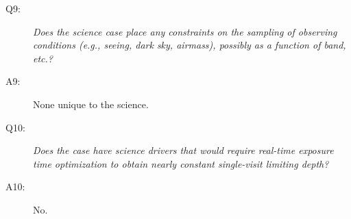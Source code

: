 \begin{description}
\item[Q9:] {\it Does the science case place any constraints on the
sampling of observing conditions (e.g., seeing, dark sky, airmass),
possibly as a function of band, etc.?}

\item[A9:] None unique to the science.

\item[Q10:] {\it Does the case have science drivers that would require
real-time exposure time optimization to obtain nearly constant
single-visit limiting depth?}

\item[A10:] No.

\end{description}

\navigationbar
